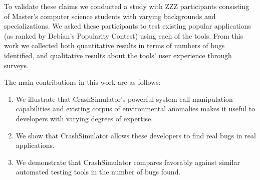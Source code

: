To validate these claims we conducted a study with ZZZ participants
consisting of Master's computer science students with varying backgrounds
and specializations.  We asked these participants to test existing popular
applications (as ranked by Debian's Popularity Contest) using each of the
tools.  From this work we collected both quantitative results in terms of
numbers of bugs identified, and qualitative results about the tools' user
experience through surveys.

The main contributions in this work are as follows:
\begin{enumerate}

\item We illustrate that CrashSimulator's powerful system call manipulation
capabilities and existing corpus of environmental anomalies makes it
useful to developers with varying degrees of expertise.

\item We show that CrashSimulator allows these developers to find real bugs
in real applications.

\item We demonstrate that CrashSimulator compares favorably against similar
automated testing tools in the number of bugs found.

\end{enumerate}
